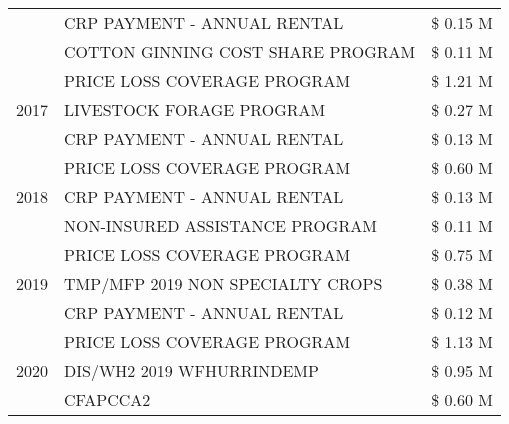 \begin{tabular}{llr}
 & CRP PAYMENT - ANNUAL RENTAL                   & \$ 0.15 M \\
 & COTTON GINNING COST SHARE PROGRAM             & \$ 0.11 M \\
\cline{1-3}
\multirow[t]{3}{*}{2017} & PRICE LOSS COVERAGE PROGRAM & \$ 1.21 M \\
 & LIVESTOCK FORAGE PROGRAM & \$ 0.27 M \\
 & CRP PAYMENT - ANNUAL RENTAL & \$ 0.13 M \\
\cline{1-3}
\multirow[t]{3}{*}{2018} & PRICE LOSS COVERAGE PROGRAM & \$ 0.60 M \\
 & CRP PAYMENT - ANNUAL RENTAL & \$ 0.13 M \\
 & NON-INSURED ASSISTANCE PROGRAM & \$ 0.11 M \\
\cline{1-3}
\multirow[t]{3}{*}{2019} & PRICE LOSS COVERAGE PROGRAM & \$ 0.75 M \\
 & TMP/MFP 2019 NON SPECIALTY CROPS & \$ 0.38 M \\
 & CRP PAYMENT - ANNUAL RENTAL & \$ 0.12 M \\
\cline{1-3}
\multirow[t]{3}{*}{2020} & PRICE LOSS COVERAGE PROGRAM & \$ 1.13 M \\
 & DIS/WH2 2019 WFHURRINDEMP & \$ 0.95 M \\
 & CFAPCCA2 & \$ 0.60 M \\
\cline{1-3}
\bottomrule
\end{tabular}
